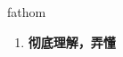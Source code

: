 
\begin{frame}
{\huge fathom}
\begin{center}
\begin{enumerate}\Large
  \item \textbf{彻底理解，弄懂}
\end{enumerate}
\end{center}
\end{frame}
